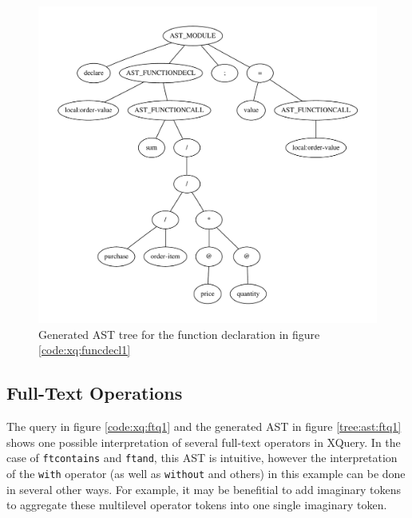 \pagebreak
\begin{figure}[h!]

\caption{Function declaration used to generate the AST in figure
\ref{tree:ast:funcdecl1}}
\label{code:xq:funcdecl1}
\centering
 \includegraphics[width=1\textwidth]{img/graphs/funcdecl1}
\caption{Generated AST tree for the function declaration in figure \ref{code:xq:funcdecl1}}
\label{tree:ast:funcdecl1}
\end{figure}

\subsection{Full-Text Operations}
The query in figure \ref{code:xq:ftq1} and the generated AST in figure
\ref{tree:ast:ftq1} shows one possible interpretation of several full-text 
operators in XQuery. In the case of \verb!ftcontains! and \verb!ftand!, this AST
is intuitive, however the interpretation of the \verb!with! operator (as well
as \verb!without! and others) in this example can be done in several other ways.
For example, it may be benefitial to add imaginary tokens to aggregate these
multilevel operator tokens into one single imaginary token.

